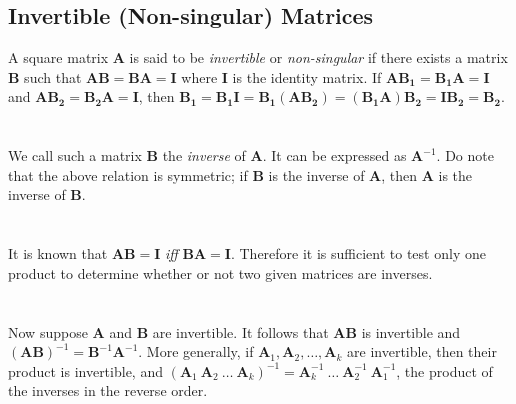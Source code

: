 \documentclass[../setup.tex]{subfiles}
\begin{document}
\subsection{Invertible (Non-singular) Matrices}
A square matrix $\bm{A}$ is said to be \textit{invertible} or \textit{non-singular} if there exists a matrix $\bm{B}$ such that $\bm{AB} = \bm{BA}= \bm{I}$ where $\bm{I}$ is the identity matrix. If $\bm{AB_1} = \bm{B_1A} = \bm{I}$ and $\bm{AB_2} = \bm{B_2A} = \bm{I}$, then $\bm{B_1} = \bm{B_1I} = \bm{B_1(AB_2)} = \bm{(B_1A)B_2} = \bm{IB_2} = \bm{B_2}$. \\
\phantom \\ \\
We call such a matrix $\bm{B}$ the \textit{inverse} of $\bm{A}$. It can be expressed as $\bm{A}^{-1}$. Do note that the above relation is symmetric; if $\bm{B}$ is the inverse of $\bm{A}$, then $\bm{A}$ is the inverse of $\bm{B}$. \\
\phantom \\ \\
It is known that $\bm{AB} = \bm{I}$ \textit{iff} $\bm{BA} = \bm{I}$. Therefore it is sufficient to test only one product to determine whether or not two given matrices are inverses. \\
\phantom \\ \\
Now suppose $\bm{A}$ and $\bm{B}$ are invertible. It follows that $\bm{AB}$ is invertible and $(\bm{AB})^{-1} = \bm{B}^{-1}\bm{A}^{-1}$. More generally, if $\bm{A}_1, \bm{A}_2, \dots, \bm{A}_k$ are invertible, then their product is invertible, and 
$(\bm{A}_1 \ \bm{A}_2 \ \dots \ \bm{A}_k)^{-1} = \bm{A}^{-1}_k \ \dots \ \bm{A}^{-1}_2 \ \bm{A}^{-1}_1$, the product of the inverses in the reverse order. \\
\phantom \\ \\
\end{document}
